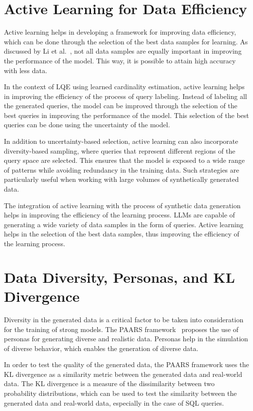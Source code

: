 \section{Active Learning for Data Efficiency}

Active learning helps in developing a framework for improving data efficiency, which can be done through the selection of the best data samples for learning. As discussed by Li et al.~\cite{DBLP:journals/tnn/LiWCJDO25}, not all data samples are equally important in improving the performance of the model. This way, it is possible to attain high accuracy with less data.

In the context of LQE using learned cardinality estimation, active learning helps in improving the efficiency of the process of query labeling. Instead of labeling all the generated queries, the model can be improved through the selection of the best queries in improving the performance of the model. This selection of the best queries can be done using the uncertainty of the model.

In addition to uncertainty-based selection, active learning can also incorporate diversity-based sampling, where queries that represent different regions of the query space are selected. This ensures that the model is exposed to a wide range of patterns while avoiding redundancy in the training data. Such strategies are particularly useful when working with large volumes of synthetically generated data.

The integration of active learning with the process of synthetic data generation helps in improving the efficiency of the learning process. LLMs are capable of generating a wide variety of data samples in the form of queries. Active learning helps in the selection of the best data samples, thus improving the efficiency of the learning process.

\section{Data Diversity, Personas, and KL Divergence}

Diversity in the generated data is a critical factor to be taken into consideration for the training of strong models. The PAARS framework~\cite{DBLP:journals/corr/abs-2503-24228} proposes the use of personas for generating diverse and realistic data. Personas help in the simulation of diverse behavior, which enables the generation of diverse data.

In order to test the quality of the generated data, the PAARS framework uses the KL divergence as a similarity metric between the generated data and real-world data. The KL divergence is a measure of the dissimilarity between two probability distributions, which can be used to test the similarity between the generated data and real-world data, especially in the case of SQL queries.

